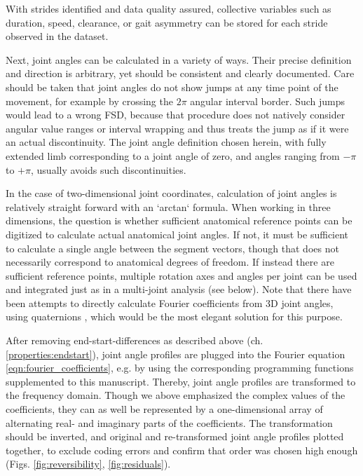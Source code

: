 With strides identified and data quality assured, collective variables such as duration, speed, clearance, or gait asymmetry can be stored for each stride observed in the dataset.


Next, joint angles can be calculated in a variety of ways.
Their precise definition and direction is arbitrary, yet should be consistent and clearly documented.
Care should be taken that joint angles do not show jumps at any time point of the movement, for example by crossing the \(2\pi\) angular interval border.
Such jumps would lead to a wrong FSD, because that procedure does not natively consider angular value ranges or interval wrapping and thus treats the jump as if it were an actual discontinuity.
The joint angle definition chosen herein, with fully extended limb corresponding to a joint angle of zero, and angles ranging from \(-\pi\) to \(+\pi\), usually avoids such discontinuities.

In the case of two-dimensional joint coordinates, calculation of joint angles is relatively straight forward with an `arctan` formula.
When working in three dimensions, the question is whether sufficient anatomical reference points can be digitized to calculate actual anatomical joint angles.
If not, it must be sufficient to calculate a single angle between the segment vectors, though that does not necessarily correspond to anatomical degrees of freedom.
If instead there are sufficient reference points, multiple rotation axes and angles per joint can be used and integrated just as in a multi-joint analysis (see below).
Note that there have been attempts to directly calculate Fourier coefficients from 3D joint angles, using quaternions \citep{Kenwright2015}, which would be the most elegant solution for this purpose.


After removing end-start-differences as described above (ch. \ref{properties:endstart}), joint angle profiles are plugged into the Fourier equation \eqref{eqn:fourier_coefficients}, e.g. by using the corresponding programming functions supplemented to this manuscript.
Thereby, joint angle profiles are transformed to the frequency domain.
Though we above emphasized the complex values of the coefficients, they can as well be represented by a one-dimensional array of alternating real- and imaginary parts of the coefficients.
The transformation should be inverted, and original and re-transformed joint angle profiles plotted together, to exclude coding errors and confirm that order was chosen high enough (Figs. \ref{fig:reversibility}, \ref{fig:residuals}).

